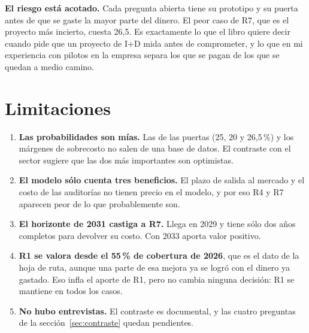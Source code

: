 \documentclass[11pt,letterpaper]{article}
\newcommand{\pct}{\,\%}
\begin{document}
\textbf{El riesgo está acotado.} Cada pregunta abierta tiene su prototipo y su
puerta antes de que se gaste la mayor parte del dinero. El peor caso de R7, que
es el proyecto más incierto, cuesta 26,5. Es exactamente lo que el libro quiere
decir cuando pide que un proyecto de I+D mida antes de comprometer, y lo que en
mi experiencia con pilotos en la empresa separa los que se pagan de los que se
quedan a medio camino.

\section{Limitaciones}
\label{sec:limitaciones}

\begin{enumerate}
\item \textbf{Las probabilidades son mías.} Las de las puertas (25, 20 y
  26,5\pct) y los márgenes de sobrecosto no salen de una base de datos. El
  contraste con el sector sugiere que las dos más importantes son optimistas.
\item \textbf{El modelo sólo cuenta tres beneficios.} El plazo de salida al
  mercado y el costo de las auditorías no tienen precio en el modelo, y por eso
  R4 y R7 aparecen peor de lo que probablemente son.
\item \textbf{El horizonte de 2031 castiga a R7.} Llega en 2029 y tiene sólo dos
  años completos para devolver su costo. Con 2033 aporta valor positivo.
\item \textbf{R1 se valora desde el 55\pct{} de cobertura de 2026}, que es el
  dato de la hoja de ruta, aunque una parte de esa mejora ya se logró con el
  dinero ya gastado. Eso infla el aporte de R1, pero no cambia ninguna decisión:
  R1 se mantiene en todos los casos.
\item \textbf{No hubo entrevistas.} El contraste es documental, y las cuatro
  preguntas de la sección~\ref{sec:contraste} quedan pendientes.
\end{enumerate}

\printbibliography[title={Referencias}]
\end{document}
